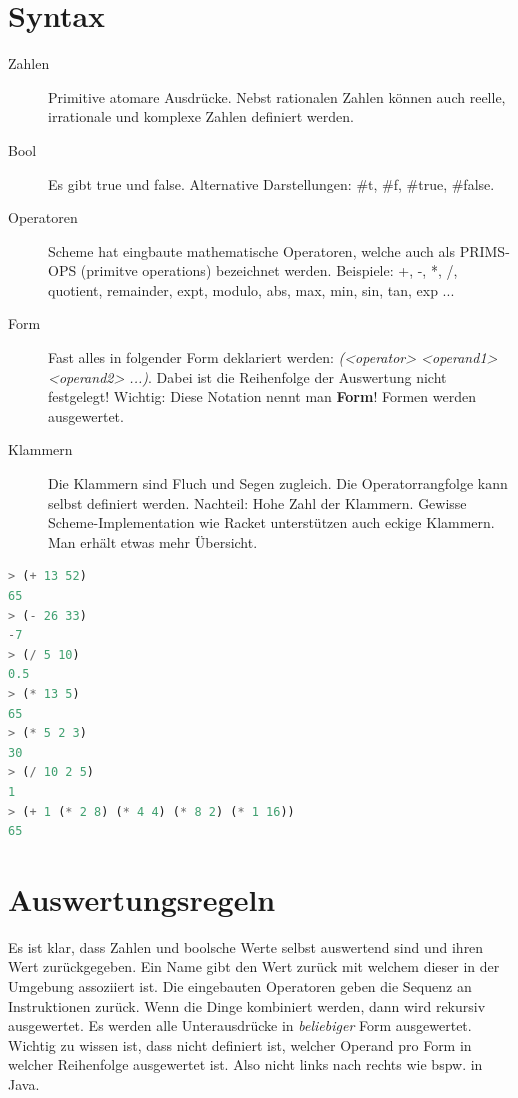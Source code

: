 \section{Syntax}
\begin{description}
	\item[Zahlen] Primitive atomare Ausdrücke. Nebst rationalen Zahlen können auch reelle, irrationale und komplexe Zahlen definiert werden.
	\item[Bool] Es gibt true und false. Alternative Darstellungen: \#t, \#f, \#true, \#false.
	\item[Operatoren] Scheme hat eingbaute mathematische Operatoren, welche auch als PRIMS-OPS (primitve operations) bezeichnet werden. Beispiele: +, -, *, /, quotient, remainder, expt, modulo, abs, max, min, sin, tan, exp ...
	\item[Form] Fast alles in folgender Form deklariert werden: \emph{(<operator> <operand1> <operand2> ...)}. Dabei ist die Reihenfolge der Auswertung nicht festgelegt! Wichtig: Diese Notation nennt man \textbf{Form}! Formen werden ausgewertet.
	\item[Klammern] Die Klammern sind Fluch und Segen zugleich. Die Operatorrangfolge kann selbst definiert werden. Nachteil: Hohe Zahl der Klammern. Gewisse Scheme-Implementation wie Racket unterstützen auch eckige Klammern. Man erhält etwas mehr Übersicht.
\end{description}

\begin{lstlisting}[language=Lisp, caption=Simple mathematische Operationen]
> (+ 13 52)
65
> (- 26 33)
-7
> (/ 5 10)
0.5
> (* 13 5)
65
> (* 5 2 3)
30
> (/ 10 2 5)
1
> (+ 1 (* 2 8) (* 4 4) (* 8 2) (* 1 16))
65
\end{lstlisting}

\section{Auswertungsregeln}
Es ist klar, dass Zahlen und boolsche Werte selbst auswertend sind und ihren Wert zurückgegeben. Ein Name gibt den Wert zurück mit welchem dieser in der Umgebung assoziiert ist. Die eingebauten Operatoren geben die Sequenz an Instruktionen zurück.
Wenn die Dinge kombiniert werden, dann wird rekursiv ausgewertet. Es werden alle Unterausdrücke in \emph{beliebiger} Form ausgewertet. Wichtig zu wissen ist, dass nicht definiert ist, welcher Operand pro Form in welcher Reihenfolge ausgewertet ist. Also nicht links nach rechts wie bspw. in Java.

